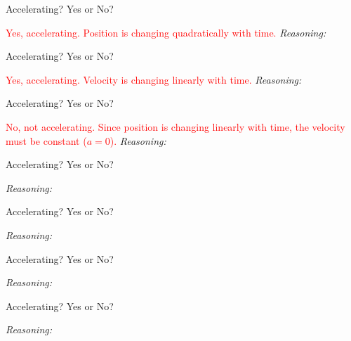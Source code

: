\documentclass[answers]{exam}
\begin{document}
\begin{questions}
\begin{multicols}{2}

\question %
Accelerating? Yes or No?


\ifprintanswers 
\textcolor{red}{Yes, accelerating. Position is changing quadratically with time.}
\else \textit{Reasoning:} \fillin[][0.73\linewidth]
\fillwithlines{7mm}
\fi

\question %
Accelerating? Yes or No?


\ifprintanswers 
\textcolor{red}{Yes, accelerating. Velocity is changing linearly with time.}
\else \textit{Reasoning:} \fillin[][0.73\linewidth]
\fillwithlines{7mm}
\fi


\question \label{IMwAV} %
Accelerating? Yes or No?


\ifprintanswers 
\textcolor{red}{No, not accelerating. Since position is changing linearly with time, the velocity must be constant ($a = 0$).}
\else \textit{Reasoning:} \fillin[][0.73\linewidth]
\fillwithlines{7mm}
\fi


\vspace*{\fill}
\columnbreak

\question %
Accelerating? Yes or No?


\ifprintanswers \else \textit{Reasoning:} \fillin[][0.73\linewidth]
\fillwithlines{7mm}
\fi

\question %
Accelerating? Yes or No?


\ifprintanswers \else \textit{Reasoning:} \fillin[][0.73\linewidth]
\fillwithlines{7mm}
\fi

\question %
Accelerating? Yes or No?


\ifprintanswers \else \textit{Reasoning:} \fillin[][0.73\linewidth]
\fillwithlines{7mm}
\fi

\clearpage

\question %
Accelerating? Yes or No?


\ifprintanswers \else \textit{Reasoning:} \fillin[][0.73\linewidth]
\fillwithlines{7mm}
\fi


\end{multicols}
\end{questions}
\end{document}
